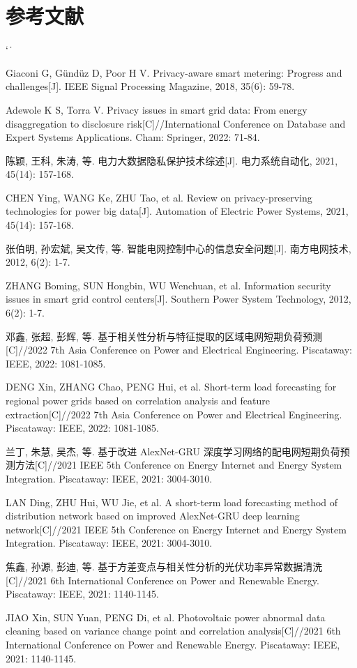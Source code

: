 \documentclass[UTF8,zihao=5,twoside]{ctexart}
\makeatletter
\numberwithin{equation}{section}
\renewcommand{\refname}{参考文献}
\renewenvironment{thebibliography}[1]{%
  \section*{\refname}%
  \small
  \list{[\arabic{enumi}]}{%
    \settowidth\labelwidth{[#1]}%
    \leftmargin\labelwidth
    \advance\leftmargin\labelsep
    \usecounter{enumi}}
  \sloppy\clubpenalty4000\widowpenalty4000\sfcode`\.\ \@m
}{\def\@noitemerr{\@latex@warning{Empty `thebibliography' environment}}\endlist}
\makeatother
\begin{document}
\begin{thebibliography}{99}
Giaconi G, Gündüz D, Poor H V. Privacy-aware smart metering: Progress and challenges[J]. IEEE Signal Processing Magazine, 2018, 35(6): 59-78.

Adewole K S, Torra V. Privacy issues in smart grid data: From energy disaggregation to disclosure risk[C]//International Conference on Database and Expert Systems Applications. Cham: Springer, 2022: 71-84.

陈颖, 王科, 朱涛, 等. 电力大数据隐私保护技术综述[J]. 电力系统自动化, 2021, 45(14): 157-168.

CHEN Ying, WANG Ke, ZHU Tao, et al. Review on privacy-preserving technologies for power big data[J]. Automation of Electric Power Systems, 2021, 45(14): 157-168.

张伯明, 孙宏斌, 吴文传, 等. 智能电网控制中心的信息安全问题[J]. 南方电网技术, 2012, 6(2): 1-7.

ZHANG Boming, SUN Hongbin, WU Wenchuan, et al. Information security issues in smart grid control centers[J]. Southern Power System Technology, 2012, 6(2): 1-7.

邓鑫, 张超, 彭辉, 等. 基于相关性分析与特征提取的区域电网短期负荷预测[C]//2022 7th Asia Conference on Power and Electrical Engineering. Piscataway: IEEE, 2022: 1081-1085.

DENG Xin, ZHANG Chao, PENG Hui, et al. Short-term load forecasting for regional power grids based on correlation analysis and feature extraction[C]//2022 7th Asia Conference on Power and Electrical Engineering. Piscataway: IEEE, 2022: 1081-1085.

兰丁, 朱慧, 吴杰, 等. 基于改进 AlexNet-GRU 深度学习网络的配电网短期负荷预测方法[C]//2021 IEEE 5th Conference on Energy Internet and Energy System Integration. Piscataway: IEEE, 2021: 3004-3010.

LAN Ding, ZHU Hui, WU Jie, et al. A short-term load forecasting method of distribution network based on improved AlexNet-GRU deep learning network[C]//2021 IEEE 5th Conference on Energy Internet and Energy System Integration. Piscataway: IEEE, 2021: 3004-3010.

焦鑫, 孙源, 彭迪, 等. 基于方差变点与相关性分析的光伏功率异常数据清洗[C]//2021 6th International Conference on Power and Renewable Energy. Piscataway: IEEE, 2021: 1140-1145.

JIAO Xin, SUN Yuan, PENG Di, et al. Photovoltaic power abnormal data cleaning based on variance change point and correlation analysis[C]//2021 6th International Conference on Power and Renewable Energy. Piscataway: IEEE, 2021: 1140-1145.


\end{thebibliography}
\end{document}
